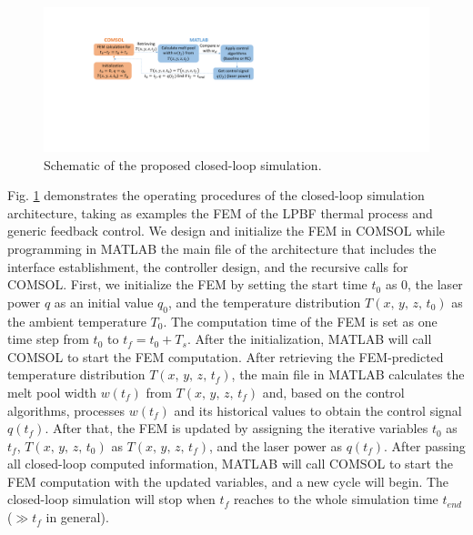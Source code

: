 \documentclass [11pt, proquest] {uwthesis}[2020/02/24]
\begin{document}
\begin{figure}[!ht]
\begin{centering}
\includegraphics[clip,width=13cm]{Closed-loop-simulation/closedloop_comsol_matlab_2}
\par\end{centering}
\centering{}\caption{\label{fig:Schematic-of-proposed}Schematic of the proposed closed-loop
simulation.}
\end{figure}
Fig. \ref{fig:Schematic-of-proposed} demonstrates the operating procedures
of the closed-loop simulation architecture, taking as examples
the FEM of the LPBF thermal process and generic feedback control. We
design and initialize the FEM in COMSOL while programming in MATLAB
the main file of the architecture that includes the interface establishment,
the controller design, and the recursive calls for COMSOL. First,
we initialize the FEM by setting the start time $t_{0}$ as 0, the
laser power $q$ as an initial value $q_{0}$, and the temperature
distribution $T(x,\,y,\,z,\,t_{0})$ as the ambient temperature $T_{0}$.
The computation time of the FEM is set as one time step from $t_{0}$
to $t_{f}=t_{0}+T_{s}$. After the initialization, MATLAB will call
COMSOL to start the FEM computation. After retrieving the FEM-predicted
temperature distribution $T(x,\,y,\,z,\,t_{f})$, the main file in
MATLAB calculates the melt pool width $w(t_{f})$ from $T(x,\,y,\,z,\,t_{f})$
and, based on the control algorithms, processes $w(t_{f})$ and its
historical values to obtain the control signal $q(t_{f})$. After
that, the FEM is updated by assigning the iterative variables $t_{0}$
as $t_{f}$, $T(x,\,y,\,z,\,t_{0})$ as $T(x,\,y,\,z,\,t_{f})$, and
the laser power as $q(t_{f})$. After passing all closed-loop computed
information, MATLAB will call COMSOL to start the FEM computation
with the updated variables, and a new cycle will begin. The closed-loop
simulation will stop when $t_{f}$ reaches to the whole simulation
time $t_{end}$ ($\gg t_{f}$ in general).
\end{document}
